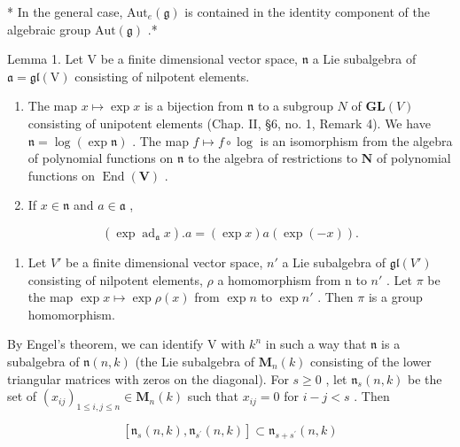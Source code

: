 * In the general case, \(\mathrm{Aut}_e(\mathfrak{g})\) is contained in the identity component of the algebraic group \(\mathrm{Aut}(\mathfrak{g})\) .*

Lemma 1. Let \(\mathrm{V}\) be a finite dimensional vector space, \(\mathfrak{n}\) a Lie subalgebra of \(\mathfrak{a} = \mathfrak{gl}(\mathrm{V})\) consisting of nilpotent elements.

\begin{enumerate}
\def\labelenumi{(\roman{enumi})}
\item
  The map \(x \mapsto \exp x\) is a bijection from \(\mathfrak{n}\) to a subgroup \(N\) of \(\mathbf{GL}(V)\) consisting of unipotent elements (Chap. II, §6, no. 1, Remark 4). We have \(\mathfrak{n} = \log(\exp \mathfrak{n})\) . The map \(f \mapsto f \circ \log\) is an isomorphism from the algebra of polynomial functions on \(\mathfrak{n}\) to the algebra of restrictions to \(\mathbf{N}\) of polynomial functions on \(\operatorname{End}(\mathbf{V})\) .
\item
  If \(x \in \mathfrak{n}\) and \(a \in \mathfrak{a}\) ,
\end{enumerate}

\[
(\exp \operatorname{ad} _ {\mathfrak {a}} x). a = (\exp x) a (\exp (- x)).
\]

\begin{enumerate}
\def\labelenumi{(\roman{enumi})}
\setcounter{enumi}{2}
\tightlist
\item
  Let \(V'\) be a finite dimensional vector space, \(n'\) a Lie subalgebra of \(\mathfrak{gl}(V')\) consisting of nilpotent elements, \(\rho\) a homomorphism from n to \(n'\) . Let \(\pi\) be the map \(\exp x \mapsto \exp \rho(x)\) from \(\exp n\) to \(\exp n'\) . Then \(\pi\) is a group homomorphism.
\end{enumerate}

By Engel's theorem, we can identify V with \(k^n\) in such a way that \(\mathfrak{n}\) is a subalgebra of \(\mathfrak{n}(n,k)\) (the Lie subalgebra of \(\mathbf{M}_n(k)\) consisting of the lower triangular matrices with zeros on the diagonal). For \(s \geq 0\) , let \(\mathfrak{n}_s(n,k)\) be the set of \((x_{ij})_{1 \leq i,j \leq n} \in \mathbf{M}_n(k)\) such that \(x_{ij} = 0\) for \(i - j < s\) . Then

\[
[ \mathfrak {n} _ {s} (n, k), \mathfrak {n} _ {s ^ {\prime}} (n, k) ] \subset \mathfrak {n} _ {s + s ^ {\prime}} (n, k)
\]

